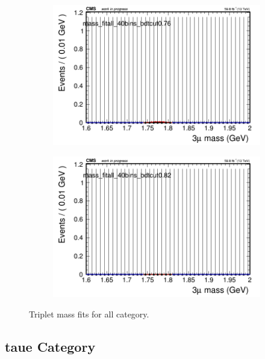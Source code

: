\begin{figure}[H]
\begin{subfigure}{0.2\textwidth}
        \caption{}
    \end{subfigure}
    \begin{subfigure}{0.2\textwidth}
        \includegraphics[width=\textwidth]{unfixed_exp/plots/all/massfit_all_40bins_bdtcut0.76.png}
        \caption{}
    \end{subfigure}
    \begin{subfigure}{0.2\textwidth}
        \includegraphics[width=\textwidth]{unfixed_exp/plots/all/massfit_all_40bins_bdtcut0.82.png}
        \caption{}
    \end{subfigure}
    \caption{Triplet mass fits for all category.}
    \label{fig:unfixedexpall}
\end{figure}

\subsection{taue Category}
\label{sec:unfixedexptaue}

